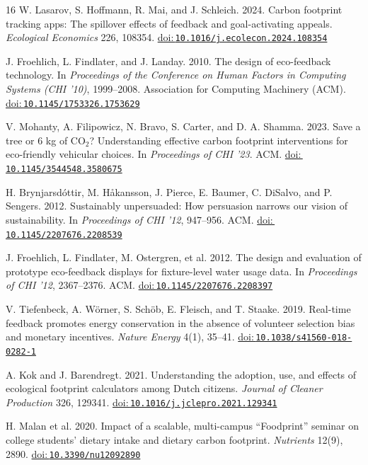 \documentclass[10pt,a4paper,twocolumn]{article}
\newcommand{\doi}[1]{\href{https://doi.org/#1}{doi:\,\nolinkurl{#1}}}
\begin{document}
\begin{thebibliography}{16}
W. Lasarov, S. Hoffmann, R. Mai, and J. Schleich. 2024. Carbon footprint tracking apps: The spillover effects of feedback and goal-activating appeals. \emph{Ecological Economics} 226, 108354. \doi{10.1016/j.ecolecon.2024.108354}

J. Froehlich, L. Findlater, and J. Landay. 2010. The design of eco-feedback technology. In \emph{Proceedings of the Conference on Human Factors in Computing Systems (CHI '10)}, 1999--2008. Association for Computing Machinery (ACM). \doi{10.1145/1753326.1753629}

V. Mohanty, A. Filipowicz, N. Bravo, S. Carter, and D. A. Shamma. 2023. Save a tree or 6 kg of CO$_2$? Understanding effective carbon footprint interventions for eco-friendly vehicular choices. In \emph{Proceedings of CHI '23}. ACM. \doi{10.1145/3544548.3580675}

H. Brynjarsd\'ottir, M. H\r{a}kansson, J. Pierce, E. Baumer, C. DiSalvo, and P. Sengers. 2012. Sustainably unpersuaded: How persuasion narrows our vision of sustainability. In \emph{Proceedings of CHI '12}, 947--956. ACM. \doi{10.1145/2207676.2208539}

J. Froehlich, L. Findlater, M. Ostergren, et al. 2012. The design and evaluation of prototype eco-feedback displays for fixture-level water usage data. In \emph{Proceedings of CHI '12}, 2367--2376. ACM. \doi{10.1145/2207676.2208397}

V. Tiefenbeck, A. W\"orner, S. Sch\"ob, E. Fleisch, and T. Staake. 2019. Real-time feedback promotes energy conservation in the absence of volunteer selection bias and monetary incentives. \emph{Nature Energy} 4(1), 35--41. \doi{10.1038/s41560-018-0282-1}

A. Kok and J. Barendregt. 2021. Understanding the adoption, use, and effects of ecological footprint calculators among Dutch citizens. \emph{Journal of Cleaner Production} 326, 129341. \doi{10.1016/j.jclepro.2021.129341}

H. Malan et al. 2020. Impact of a scalable, multi-campus ``Foodprint'' seminar on college students' dietary intake and dietary carbon footprint. \emph{Nutrients} 12(9), 2890. \doi{10.3390/nu12092890}

\end{thebibliography}
\end{document}
